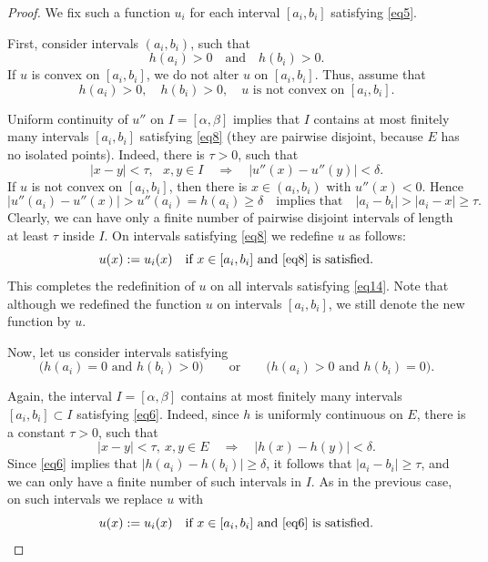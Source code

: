 \documentclass[intlimits,12pt,reqno]{amsart}
\theoremstyle{definition}
\begin{document}
\begin{proof}
We fix such a function $u_i$ for each interval $[a_i,b_i]$ satisfying \eqref{eq5}.

First, consider intervals $(a_i,b_i)$, such that
\begin{equation}
\label{eq14}
h(a_i)>0
\quad
\text{and}
\quad
h(b_i)>0.
\end{equation}
If $u$ is convex on $[a_i,b_i]$, we do not alter $u$ on $[a_i,b_i]$.  Thus, assume that
\begin{equation}
\label{eq8}
h(a_i)>0,
\quad
h(b_i)>0,
\quad
u \text{ is not convex on } [a_i,b_i].
\end{equation}

Uniform continuity of $u''$ on $I=[\alpha,\beta]$ implies that $I$ contains at most finitely many intervals $[a_i,b_i]$ satisfying \eqref{eq8} (they are pairwise disjoint, because $E$ has no isolated points). Indeed, there is $\tau>0$, such that
$$
|x-y|<\tau,\,\,\,\, x,y\in I
\quad
\Longrightarrow
\quad
|u''(x)-u''(y)|<\delta.
$$
If $u$ is not convex on $[a_i,b_i]$, then there is $x\in (a_i,b_i)$ with $u''(x)<0$. Hence
$$
|u''(a_i)-u''(x)|>u''(a_i)=h(a_i)\geq\delta
\quad
\text{implies that}
\quad
|a_i-b_i|>|a_i-x|\geq\tau.
$$
Clearly, we can have only a finite number of pairwise disjoint intervals of length at least $\tau$ inside $I$.
On intervals satisfying \eqref{eq8} we redefine $u$ as follows:
$$
u(x):=u_i(x)
\quad
\text{if } x\in [a_i,b_i]
\text{ and } \eqref{eq8} \text{ is satisfied.}
$$
This completes the redefinition of $u$ on all intervals satisfying \eqref{eq14}.
Note that although we redefined the function $u$ on intervals $[a_i,b_i]$, we still denote the new function by $u$.

Now, let us consider intervals satisfying
\begin{equation}
\label{eq6}
\big(h(a_i)=0 \text{ and } h(b_i)>0\big)
\qquad
\text{or}
\qquad
\big(h(a_i)>0 \text{ and } h(b_i)=0\big).
\end{equation}

Again, the interval $I=[\alpha,\beta]$ contains at most finitely many intervals $[a_i,b_i]\subset I$ satisfying \eqref{eq6}.
Indeed, since $h$ is uniformly continuous on $E$, there is a constant $\tau>0$, such that
$$
|x-y|<\tau,\ x,y\in E
\quad
\Longrightarrow
\quad
|h(x)-h(y)|<\delta.
$$
Since \eqref{eq6} implies that $|h(a_i)-h(b_i)|\geq \delta$, it follows that $|a_i-b_i|\geq\tau$,
and we can only have a finite number of such intervals in $I$.
As in the previous case, on such intervals we replace $u$ with
\begin{equation}
\label{eq7}
u(x):=u_i(x)
\quad
\text{if } x\in [a_i,b_i] \text{ and } \eqref{eq6} \text{ is satisfied.}
\end{equation}


\end{proof}
\end{document}
